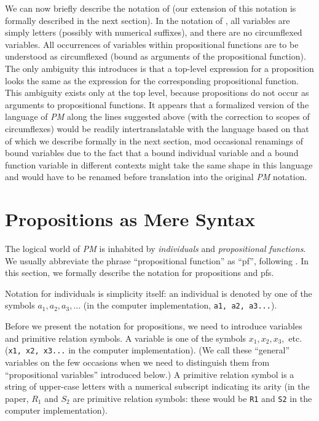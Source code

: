 \documentclass{article}
\begin{document}
We can now briefly describe the notation of \cite{types40} (our
extension of this notation is formally described in the next section).
In the notation of \cite{types40}, all variables are simply letters
(possibly with numerical suffixes), and there are no circumflexed
variables.  All occurrences of variables within propositional
functions are to be understood as circumflexed (bound as arguments of
the propositional function).  The only ambiguity this introduces is
that a top-level expression for a proposition looks the same as the
expression for the corresponding propositional function.  This
ambiguity exists only at the top level, because propositions do not
occur as arguments to propositional functions.  It appears that a
formalized version of the language of {\em PM\/} along the lines
suggested above (with the correction to scopes of circumflexes) would
be readily intertranslatable with the language based on that of
\cite{types40} which we describe formally in the next section, mod
occasional renamings of bound variables due to the fact that a bound
individual variable and a bound function variable in different
contexts might take the same shape in this language and would have to be
renamed before translation into the original {\em PM\/} notation.

\section{Propositions as Mere Syntax}

The logical world of {\em PM\/} is inhabited by {\em individuals\/}
and {\em propositional functions\/}.  We usually abbreviate the phrase
``propositional function'' as ``pf'', following \cite{types40}.  In this
section, we formally describe the notation for propositions and pfs.

Notation for individuals is simplicity itself: an individual is
denoted by one of the symbols $a_1,a_2,a_3,\ldots$ (in the computer
implementation, {\tt a1, a2, a3...}).

Before we present the notation for propositions, we need to introduce
variables and primitive relation symbols.  A variable is one of the
symbols $x_1, x_2, x_3,$ etc. ({\tt x1, x2, x3...} in the computer
implementation).  (We call these ``general'' variables on the few
occasions when we need to distinguish them from ``propositional
variables'' introduced below.)  A primitive relation symbol is a
string of upper-case letters with a numerical subscript indicating its
arity (in the paper, $R_1$ and $S_2$ are primitive relation symbols:
these would be {\tt R1} and {\tt S2} in the computer implementation).
\end{document}
